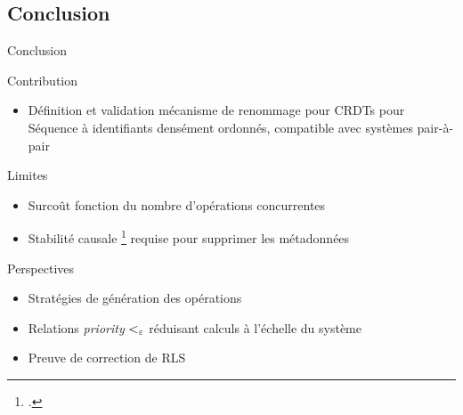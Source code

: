 \subsection{Conclusion}

\begin{frame}{Conclusion}
  \begin{block}{Contribution}
    \begin{itemize}
      \item Définition et validation mécanisme de renommage pour CRDTs pour Séquence à identifiants densément ordonnés, compatible avec systèmes pair-à-pair
    \end{itemize}
  \end{block}
  \begin{block}{Limites}
    \begin{itemize}
      \item Surcoût fonction du nombre d'opérations \ren concurrentes
      \item Stabilité causale \footcite{baquero2017pure} requise pour supprimer les métadonnées
    \end{itemize}
  \end{block}
  \begin{block}{Perspectives}
    \begin{itemize}
      \item Stratégies de génération des opérations \ren
      \item Relations \emph{priority} $<_{\varepsilon}$ réduisant calculs à l'échelle du système
      \item Preuve de correction de RLS
    \end{itemize}
  \end{block}
\end{frame}

